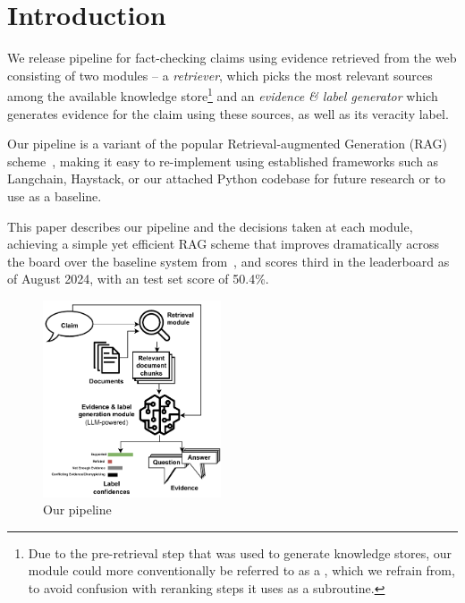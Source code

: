 
\section{Introduction}
\label{sec:introduction}
We release  pipeline for fact-checking claims using evidence retrieved from the web consisting of two modules -- a \textit{retriever}, which picks the most relevant sources among the available knowledge store\footnote{Due to the pre-retrieval step that was used to generate knowledge stores, our  module could more conventionally be referred to as a , which we refrain from, to avoid confusion with reranking steps it uses as a subroutine.} and an \textit{evidence \& label generator} which generates evidence for the claim using these sources, as well as its veracity label. 

Our pipeline is a variant of the popular Retrieval-augmented Generation (RAG) scheme~\cite{rag}, making it easy to re-implement using established frameworks such as Langchain, Haystack, or our attached Python codebase for future research or to use as a baseline.

This paper describes our pipeline and the decisions taken at each module, achieving a simple yet efficient RAG scheme that improves dramatically across the board over the baseline system from~\cite{averitec2024}, and scores third in the \averitec{} leaderboard as of August 2024, with an \averitec{} test set score of 50.4\%.

\begin{figure}[h]
    \centering
    \includegraphics[width=0.47\textwidth]{figures/pipeline.pdf}
    \caption{Our pipeline}
    \label{fig:pipeline}
\end{figure}


